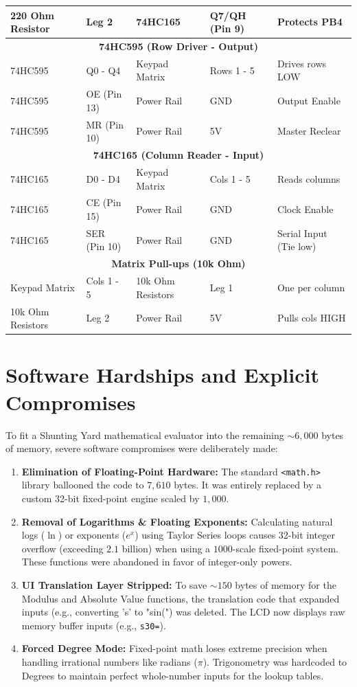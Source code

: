 \documentclass[conference]{IEEEtran}
\begin{document}
\begin{table}[htbp]
\begin{tabular}{|l|l|l|l|l|}
\hline
220 Ohm Resistor & Leg 2 & 74HC165 & Q7/QH (Pin 9) & Protects PB4 \\
\hline
\hline
\multicolumn{5}{|c|}{\textbf{74HC595 (Row Driver - Output)}} \\
\hline
74HC595 & Q0 - Q4 & Keypad Matrix & Rows 1 - 5 & Drives rows LOW \\
\hline
74HC595 & OE (Pin 13) & Power Rail & GND & Output Enable \\
\hline
74HC595 & MR (Pin 10) & Power Rail & 5V & Master Reclear \\
\hline
\hline
\multicolumn{5}{|c|}{\textbf{74HC165 (Column Reader - Input)}} \\
\hline
74HC165 & D0 - D4 & Keypad Matrix & Cols 1 - 5 & Reads columns \\
\hline
74HC165 & CE (Pin 15) & Power Rail & GND & Clock Enable \\
\hline
74HC165 & SER (Pin 10) & Power Rail & GND & Serial Input (Tie low)\\
\hline
\hline
\multicolumn{5}{|c|}{\textbf{Matrix Pull-ups (10k Ohm)}} \\
\hline
Keypad Matrix & Cols 1 - 5 & 10k Ohm Resistors & Leg 1 & One per column \\
\hline
10k Ohm Resistors & Leg 2 & Power Rail & 5V & Pulls cols HIGH \\
\hline
\end{tabular}
\end{table}

\section{Software Hardships and Explicit Compromises}

To fit a Shunting Yard mathematical evaluator into the remaining $\sim 6,000$ bytes of memory, severe software compromises were deliberately made:

\begin{enumerate}
    \item \textbf{Elimination of Floating-Point Hardware:} The standard \texttt{<math.h>} library ballooned the code to $7,610$ bytes. It was entirely replaced by a custom 32-bit fixed-point engine scaled by $1,000$.
    \item \textbf{Removal of Logarithms \& Floating Exponents:} Calculating natural logs ($\ln$) or exponents ($e^x$) using Taylor Series loops causes 32-bit integer overflow (exceeding $2.1$ billion) when using a $1000$-scale fixed-point system. These functions were abandoned in favor of integer-only powers.
    \item \textbf{UI Translation Layer Stripped:} To save $\sim 150$ bytes of memory for the Modulus and Absolute Value functions, the translation code that expanded inputs (e.g., converting 's' to "sin(") was deleted. The LCD now displays raw memory buffer inputs (e.g., \texttt{s30=}).
    \item \textbf{Forced Degree Mode:} Fixed-point math loses extreme precision when handling irrational numbers like radians ($\pi$). Trigonometry was hardcoded to Degrees to maintain perfect whole-number inputs for the lookup tables.
\end{enumerate}
\end{document}
